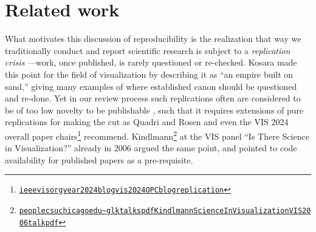\documentclass[conference]{vgtc}                     %
\begin{document}
\section{Related work}
\label{sec:rw}

What motivates this discussion of reproducibility is the realization that way we traditionally conduct and report scientific research is subject to a \emph{replication crisis} \cite{Kosara:2018:SRC,Cockburn:2020:TRC}---work, once published, is rarely questioned or re-checked. Kosara \cite{Kosara:2016:EBS} made this point for the field of visualization by describing it as ``an empire built on sand,'' giving many examples of where established canon should be questioned and re-done. Yet in our review process such replications often are considered to be of too low novelty to be publishable \cite{Quadri:2019:YCP}, such that it requires extensions of pure replications for making the cut as Quadri and Rosen \cite{Quadri:2019:YCP} and even the VIS 2024 overall paper chairs\footnote{\href{https://ieeevis.org/year/2024/blog/vis-2024-OPC-blog-replication}{\texttt{ieeevisorg\discretionary{/}{}{/}year\discretionary{/}{}{/}2024\discretionary{/}{}{/}blog\discretionary{/}{}{/}vis\discretionary{}{-}{-}2024\discretionary{}{-}{-}OPC\discretionary{}{-}{-}blog\discretionary{}{-}{-}replication}}} recommend. Kindlmann\footnote{\href{https://people.cs.uchicago.edu/~glk/talks/pdf/Kindlmann-ScienceInVisualization-VIS-2006-talk.pdf}{\texttt{peoplecsuchicagoedu\discretionary{/}{}{/}\~{}glk\discretionary{/}{}{/}talks\discretionary{/}{}{/}pdf\discretionary{/}{}{/}Kindlmann\discretionary{}{-}{-}ScienceInVisualization\discretionary{}{-}{-}VIS\discretionary{}{-}{-}2006\discretionary{}{-}{-}talkpdf}}} at the VIS panel ``Is There Science in Visualization?'' already in 2006 argued the same point, and pointed to code availability for published papers as a pre-requisite.
\end{document}
